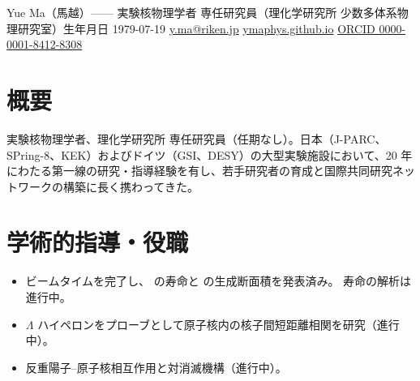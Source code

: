\documentclass[a4paper,11pt,fontset=none]{ctexart}
\begin{document}
  {Yue Ma（馬越）—— 実験核物理学者}
  {専任研究員（理化学研究所 少数多体系物理研究室）\quad\textbar\quad 生年月日 1979-07-19 \quad\textbar\quad \href{mailto:y.ma@riken.jp}{y.ma@riken.jp} \quad\textbar\quad \href{https://ymaphys.github.io}{ymaphys.github.io} \quad\textbar\quad \href{https://orcid.org/0000-0001-8412-8308}{ORCID 0000-0001-8412-8308}}

\section{概要}

実験核物理学者、理化学研究所 専任研究員（任期なし）。日本（J-PARC、SPring-8、KEK）およびドイツ（GSI、DESY）の大型実験施設において、20 年にわたる第一線の研究・指導経験を有し、若手研究者の育成と国際共同研究ネットワークの構築に長く携わってきた。

\section{学術的指導・役職}
\begin{itemize}
  \item {} ビームタイムを完了し、 の寿命と  の生成断面積を発表済み。 寿命の解析は進行中。
  \item {} $\Lambda$ ハイペロンをプローブとして原子核内の核子間短距離相関を研究（進行中）。
  \item {} 反重陽子–原子核相互作用と対消滅機構（進行中）。
\end{itemize}
\end{document}

